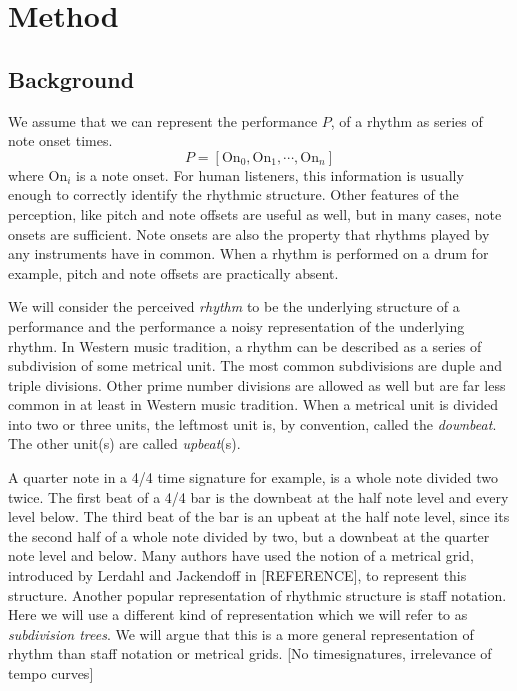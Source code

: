 \chapter{Method}
\label{sec:method}


\section{Background}

We assume that we can represent the performance $P$, of a rhythm as series of note onset times. 
\begin{equation}
\label{eq:performance}
P = [\mathrm{On}_0, \mathrm{On}_1, \cdots, \mathrm{On}_n]
\end{equation}
where $\mathrm{On}_i$ is a note onset. For human listeners, this information is usually enough to correctly identify the rhythmic structure. Other features of the perception, like pitch and note offsets are useful as well, but in many cases, note onsets are sufficient. Note onsets are also the property that rhythms played by any instruments have in common. When a rhythm is performed on a drum for example, pitch and note offsets are practically absent.

We will consider the perceived \textit{rhythm} to be the underlying structure of a performance and the performance a noisy representation of the underlying rhythm. In Western music tradition, a rhythm can be described as a series of subdivision of some metrical unit. The most common subdivisions are duple and triple divisions. Other prime number divisions are allowed as well but are far less common in at least in Western music tradition. When a metrical unit is divided into two or three units, the leftmost unit is, by convention, called the \textit{downbeat}. The other unit(s) are called \textit{upbeat}(s).

A quarter note in a 4/4 time signature for example, is a whole note divided two twice. The first beat of a 4/4 bar is the downbeat at the half note level and every level below. The third beat of the bar is an upbeat at the half note level, since its the second half of a whole note divided by two, but a downbeat at the quarter note level and below. Many authors have used the notion of a metrical grid, introduced by Lerdahl and Jackendoff in [REFERENCE], to represent this structure. Another popular representation of rhythmic structure is staff notation. Here we will use a different kind of representation which we will refer to as \textit{subdivision trees}. We will argue that this is a more general representation of rhythm than staff notation or metrical grids. [No timesignatures, irrelevance of tempo curves]

